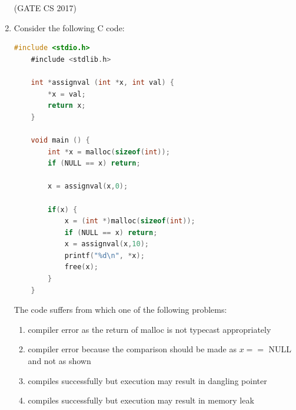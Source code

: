 \documentclass[a4paper, 11pt]{article}
\begin{document}
\begin{enumerate}
    \begin{enumerate}
    \end{enumerate}
    
    \hfill (GATE CS 2017)
    
    \item Consider the following C code:
    
    \begin{lstlisting}[language=C]
    #include <stdio.h>
    #include <stdlib.h>
    
    int *assignval (int *x, int val) {
        *x = val;
        return x;
    }
    
    void main () {
        int *x = malloc(sizeof(int));
        if (NULL == x) return;
    
        x = assignval(x,0);
        
        if(x) {
            x = (int *)malloc(sizeof(int));
            if (NULL == x) return;
            x = assignval(x,10);
            printf("%d\n", *x);
            free(x);
        }
    }
    \end{lstlisting}
    
    The code suffers from which one of the following problems:
    
    \begin{enumerate}
        \item compiler error as the return of malloc is not typecast appropriately
        \item compiler error because the comparison should be made as $x==$ NULL and not as shown
        \item compiles successfully but execution may result in dangling pointer
        \item compiles successfully but execution may result in memory leak
    \end{enumerate}
    

\end{enumerate}
\end{document}
